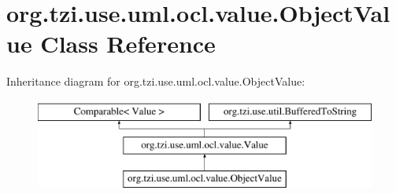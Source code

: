 \hypertarget{classorg_1_1tzi_1_1use_1_1uml_1_1ocl_1_1value_1_1_object_value}{\section{org.\-tzi.\-use.\-uml.\-ocl.\-value.\-Object\-Value Class Reference}
\label{classorg_1_1tzi_1_1use_1_1uml_1_1ocl_1_1value_1_1_object_value}
}
Inheritance diagram for org.\-tzi.\-use.\-uml.\-ocl.\-value.\-Object\-Value\-:\begin{figure}[H]
\begin{center}
\leavevmode
\includegraphics[height=3.000000cm]{classorg_1_1tzi_1_1use_1_1uml_1_1ocl_1_1value_1_1_object_value}
\end{center}
\end{figure}
